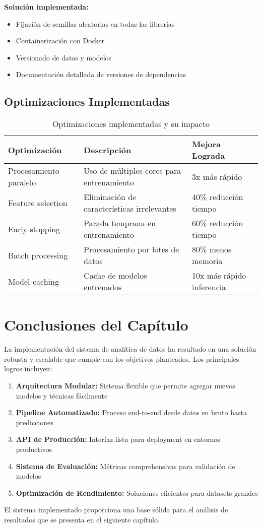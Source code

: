 \textbf{Solución implementada:}
\begin{itemize}
    \item Fijación de semillas aleatorias en todas las librerías
    \item Containerización con Docker
    \item Versionado de datos y modelos
    \item Documentación detallada de versiones de dependencias
\end{itemize}

\subsection{Optimizaciones Implementadas}

\begin{table}[htbp]
\centering
\caption{Optimizaciones implementadas y su impacto}
\begin{tabular}{@{}p{4cm}p{5cm}p{4cm}@{}}
\toprule
\textbf{Optimización} & \textbf{Descripción} & \textbf{Mejora Lograda} \\
\midrule
Procesamiento paralelo & Uso de múltiples cores para entrenamiento & 3x más rápido \\
Feature selection & Eliminación de características irrelevantes & 40\% reducción tiempo \\
Early stopping & Parada temprana en entrenamiento & 60\% reducción tiempo \\
Batch processing & Procesamiento por lotes de datos & 80\% menos memoria \\
Model caching & Cache de modelos entrenados & 10x más rápido inferencia \\
\bottomrule
\end{tabular}
\label{tab:optimizaciones}
\end{table}

\section{Conclusiones del Capítulo}

La implementación del sistema de analítica de datos ha resultado en una solución robusta y escalable que cumple con los objetivos planteados. Los principales logros incluyen:

\begin{enumerate}
    \item \textbf{Arquitectura Modular:} Sistema flexible que permite agregar nuevos modelos y técnicas fácilmente
    \item \textbf{Pipeline Automatizado:} Proceso end-to-end desde datos en bruto hasta predicciones
    \item \textbf{API de Producción:} Interfaz lista para deployment en entornos productivos
    \item \textbf{Sistema de Evaluación:} Métricas comprehensivas para validación de modelos
    \item \textbf{Optimización de Rendimiento:} Soluciones eficientes para datasets grandes
\end{enumerate}

El sistema implementado proporciona una base sólida para el análisis de resultados que se presenta en el siguiente capítulo.
